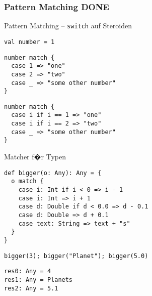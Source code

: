 \documentclass[14pt,aspectratio=169,trans]{beamer} %
\begin{document}
\subsubsection*{Pattern Matching DONE}





\begin{frame}[fragile]{}
	\begin{block}{Pattern Matching -- \texttt{switch} auf Steroiden}
\scriptsize
	\onslide<2->
  \begin{lstlisting}
val number = 1
	\end{lstlisting}
  \begin{lstlisting}[firstnumber=2]
number match {
  case 1 => "one"
  case 2 => "two"
  case _ => "some other number"
}
	\end{lstlisting}
  \begin{lstlisting}[firstnumber=7]
number match {
  case i if i == 1 => "one"
  case i if i == 2 => "two"
  case _ => "some other number"
}
	\end{lstlisting}
	\end{block}
\end{frame}

\begin{frame}[fragile]{}
	\begin{block}{Matcher f�r Typen}
\scriptsize
	\onslide<2->
  \begin{lstlisting}
def bigger(o: Any): Any = {
  o match {
    case i: Int if i < 0 => i - 1
    case i: Int => i + 1
    case d: Double if d < 0.0 => d - 0.1
    case d: Double => d + 0.1
    case text: String => text + "s"
  }
}
	\end{lstlisting}
  \begin{lstlisting}[firstnumber=10]
bigger(3); bigger("Planet"); bigger(5.0)
	\end{lstlisting}
  \begin{lstlisting}[firstnumber=11]
res0: Any = 4
res1: Any = Planets
res2: Any = 5.1
	\end{lstlisting}
	\end{block}
	\note{}
\end{frame}
\end{document}
